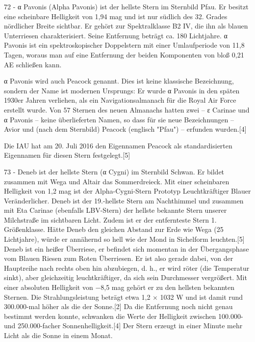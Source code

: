 72 - α Pavonis (Alpha Pavonis) ist der hellste Stern im Sternbild Pfau. Er besitzt eine scheinbare Helligkeit von 1,94 mag und ist nur südlich des 32. Grades nördlicher Breite sichtbar. Er gehört zur Spektralklasse B2 IV, die ihn als blauen Unterriesen charakterisiert. Seine Entfernung beträgt ca. 180 Lichtjahre. α Pavonis ist ein spektroskopischer Doppelstern mit einer Umlaufperiode von 11,8 Tagen, woraus man auf eine Entfernung der beiden Komponenten von bloß 0,21 AE schließen kann.

α Pavonis wird auch Peacock genannt. Dies ist keine klassische Bezeichnung, sondern der Name ist modernen Ursprungs: Er wurde α Pavonis in den späten 1930er Jahren verliehen, als ein Navigationsalmanach für die Royal Air Force erstellt wurde. Von 57 Sternen des neuen Almanachs hatten zwei – ε Carinae und α Pavonis – keine überlieferten Namen, so dass für sie neue Bezeichnungen – Avior und (nach dem Sternbild) Peacock (englisch "Pfau") – erfunden wurden.[4]

Die IAU hat am 20. Juli 2016 den Eigennamen Peacock als standardisierten Eigennamen für diesen Stern festgelegt.[5] 



73 - Deneb ist der hellste Stern (α Cygni) im Sternbild Schwan. Er bildet zusammen mit Wega und Altair das Sommerdreieck. Mit einer scheinbaren Helligkeit von 1,2 mag ist der Alpha-Cygni-Stern Prototyp Leuchtkräftiger Blauer Veränderlicher. Deneb ist der 19.-hellste Stern am Nachthimmel und zusammen mit Eta Carinae (ebenfalls LBV-Stern) der hellste bekannte Stern unserer Milchstraße im sichtbaren Licht. Zudem ist er der entfernteste Stern 1. Größenklasse. Hätte Deneb den gleichen Abstand zur Erde wie Wega (25 Lichtjahre), würde er annähernd so hell wie der Mond in Sichelform leuchten.[5] 
Deneb ist ein heißer Überriese, er befindet sich momentan in der Übergangsphase vom Blauen Riesen zum Roten Überriesen. Er ist also gerade dabei, von der Hauptreihe nach rechts oben hin abzubiegen, d. h., er wird röter (die Temperatur sinkt), aber gleichzeitig leuchtkräftiger, da sich sein Durchmesser vergrößert. Mit einer absoluten Helligkeit von −8,5 mag gehört er zu den hellsten bekannten Sternen. Die Strahlungsleistung beträgt etwa 1,2 × 1032 W und ist damit rund 300.000-mal höher als die der Sonne.[2] Da die Entfernung noch nicht genau bestimmt werden konnte, schwanken die Werte der Helligkeit zwischen 100.000- und 250.000-facher Sonnenhelligkeit.[4] Der Stern erzeugt in einer Minute mehr Licht als die Sonne in einem Monat. 



